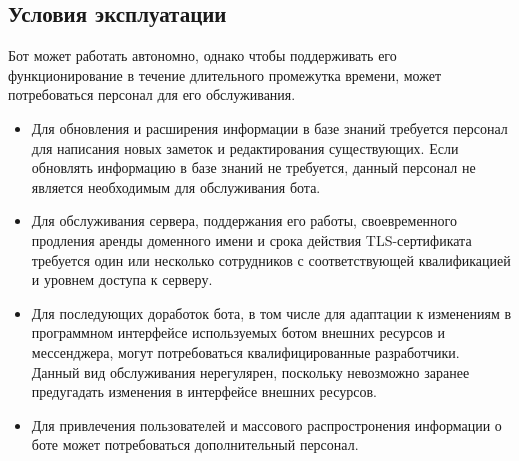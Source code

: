 \subsection{Условия эксплуатации}
\label{sec:req:maint}
Бот может работать автономно, однако чтобы поддерживать его функционирование в течение
длительного промежутка времени, может потребоваться персонал для его обслуживания.

\begin{itemize}
    \item
        Для обновления и расширения информации в базе знаний требуется персонал для
        написания новых заметок и редактирования существующих. Если обновлять информацию
        в базе знаний не требуется, данный персонал не является необходимым для обслуживания бота.
    \item
        Для обслуживания сервера, поддержания его работы, своевременного продления аренды доменного имени
        и срока действия TLS-сертификата требуется один или несколько сотрудников с соответствующей
        квалификацией и уровнем доступа к серверу.
    \item
        Для последующих доработок бота, в том числе для адаптации к изменениям в программном интерфейсе
        используемых ботом внешних ресурсов и мессенджера, могут потребоваться квалифицированные
        разработчики. Данный вид обслуживания нерегулярен, поскольку невозможно заранее предугадать
        изменения в интерфейсе внешних ресурсов.
    \item
        Для привлечения пользователей и массового распростронения информации о боте может
        потребоваться дополнительный персонал.
\end{itemize}
